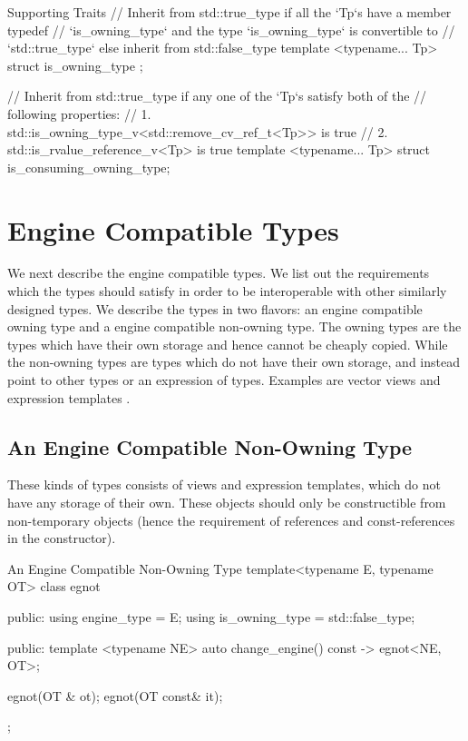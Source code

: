 \documentclass[oneside,11pt,a4paper]{jbarticle}
\begin{document}
\begin{codecpp}{Supporting Traits}
// Inherit from std::true_type if all the `Tp`s have a member typedef
// `is_owning_type` and the type `is_owning_type` is convertible to
// `std::true_type` else inherit from std::false_type
template <typename... Tp>
struct is_owning_type ;

// Inherit from std::true_type if any one of the `Tp`s satisfy both of the
// following properties:
// 1. std::is_owning_type_v<std::remove_cv_ref_t<Tp>> is true
// 2. std::is_rvalue_reference_v<Tp> is true
template <typename... Tp>
struct is_consuming_owning_type;
\end{codecpp}



\section{Engine Compatible Types}

We next describe the engine compatible types. We list out the requirements which
the types should satisfy in order to be interoperable with other similarly
designed types. We describe the types in two flavors: an engine compatible
owning type and a engine compatible non-owning type. The owning types are the
types which have their own storage and hence cannot be cheaply copied. While the
non-owning types are types which do not have their own storage, and instead
point to other types or an expression of types. Examples are vector views
and expression templates .

\subsection{An Engine Compatible Non-Owning Type}

These kinds of types  consists of views and expression templates, which do not
have any storage of their own. These objects should only be constructible from
non-temporary objects (hence the requirement of references and const-references
in the constructor).

\begin{codecpp}{An Engine Compatible Non-Owning Type}
  template<typename E, typename OT>
  class egnot {
  public:
    using engine_type = E;
    using is_owning_type = std::false_type;

  public:
    template <typename NE>
    auto change_engine() const -> egnot<NE, OT>;

    egnot(OT & ot);
    egnot(OT const& it);
  };
\end{codecpp}
\end{document}
